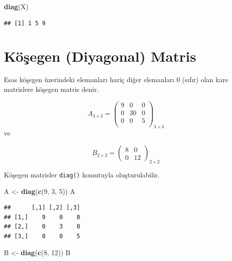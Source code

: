 \documentclass[
]{book}
\newenvironment{Shaded}{\begin{snugshade}}{\end{snugshade}}
\newcommand{\DecValTok}[1]{\textcolor[rgb]{0.00,0.00,0.81}{#1}}
\newcommand{\FunctionTok}[1]{\textcolor[rgb]{0.13,0.29,0.53}{\textbf{#1}}}
\newcommand{\NormalTok}[1]{#1}
\newcommand{\OtherTok}[1]{\textcolor[rgb]{0.56,0.35,0.01}{#1}}
\begin{document}
\begin{Shaded}
\begin{Highlighting}[]
\FunctionTok{diag}\NormalTok{(X)}
\end{Highlighting}
\end{Shaded}

\begin{verbatim}
## [1] 1 5 9
\end{verbatim}

\section{Köşegen (Diyagonal) Matris}\label{kuxf6ux15fegen-diyagonal-matris}

Esas köşegen üzerindeki elemanları hariç diğer elemanları 0 (sıfır) olan kare matrislere köşegen matris denir.

\[A_{3×3} =
  \begin{pmatrix}
9 & 0 & 0 \\
0 & 30 & 0 \\
0 & 0 & 5 \\
\end{pmatrix}_{3×3}\]
ve

\[B_{2×2} =
  \begin{pmatrix}
8 & 0 \\
0 & 12 
\end{pmatrix}_{2×2}\]

Köşegen matrisler \texttt{diag()} komutuyla oluşturulabilir.

\begin{Shaded}
\begin{Highlighting}[]
\NormalTok{A }\OtherTok{\textless{}{-}} \FunctionTok{diag}\NormalTok{(}\FunctionTok{c}\NormalTok{(}\DecValTok{9}\NormalTok{, }\DecValTok{3}\NormalTok{, }\DecValTok{5}\NormalTok{)) }
\NormalTok{A }
\end{Highlighting}
\end{Shaded}

\begin{verbatim}
##      [,1] [,2] [,3]
## [1,]    9    0    0
## [2,]    0    3    0
## [3,]    0    0    5
\end{verbatim}

\begin{Shaded}
\begin{Highlighting}[]
\NormalTok{B }\OtherTok{\textless{}{-}} \FunctionTok{diag}\NormalTok{(}\FunctionTok{c}\NormalTok{(}\DecValTok{8}\NormalTok{, }\DecValTok{12}\NormalTok{)) }
\NormalTok{B }
\end{Highlighting}
\end{Shaded}
\end{document}
